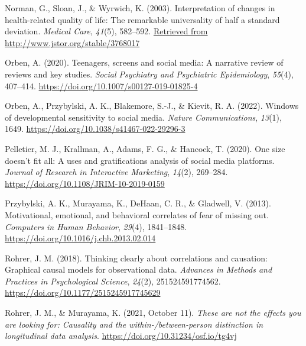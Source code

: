 \documentclass[
  man,mask,floatsintext]{apa7}
\newlength{\cslhangindent}
\newlength{\cslentryspacingunit} %
\newenvironment{CSLReferences}[2] %
 {%
  \setlength{\parindent}{0pt}
  \ifodd #1
  \let\oldpar\par
  \def\par{\hangindent=\cslhangindent\oldpar}
  \fi
  \setlength{\parskip}{#2\cslentryspacingunit}
 }%
 {}
\begin{document}
\begin{CSLReferences}{1}{0}
\leavevmode{}%
Norman, G., Sloan, J., \& Wyrwich, K. (2003). Interpretation of changes in health-related quality of life: {The} remarkable universality of half a standard deviation. \emph{Medical Care}, \emph{41}(5), 582--592. \href{Retrieved\%20from\%20http://www.jstor.org/stable/3768017}{Retrieved from http://www.jstor.org/stable/3768017}

\leavevmode{}%
Orben, A. (2020). Teenagers, screens and social media: A narrative review of reviews and key studies. \emph{Social Psychiatry and Psychiatric Epidemiology}, \emph{55}(4), 407--414. \url{https://doi.org/10.1007/s00127-019-01825-4}

\leavevmode{}%
Orben, A., Przybylski, A. K., Blakemore, S.-J., \& Kievit, R. A. (2022). Windows of developmental sensitivity to social media. \emph{Nature Communications}, \emph{13}(1), 1649. \url{https://doi.org/10.1038/s41467-022-29296-3}

\leavevmode{}%
Pelletier, M. J., Krallman, A., Adams, F. G., \& Hancock, T. (2020). One size doesn't fit all: A uses and gratifications analysis of social media platforms. \emph{Journal of Research in Interactive Marketing}, \emph{14}(2), 269--284. \url{https://doi.org/10.1108/JRIM-10-2019-0159}

\leavevmode{}%
Przybylski, A. K., Murayama, K., DeHaan, C. R., \& Gladwell, V. (2013). Motivational, emotional, and behavioral correlates of fear of missing out. \emph{Computers in Human Behavior}, \emph{29}(4), 1841--1848. \url{https://doi.org/10.1016/j.chb.2013.02.014}

\leavevmode{}%
Rohrer, J. M. (2018). Thinking clearly about correlations and causation: {Graphical} causal models for observational data. \emph{Advances in Methods and Practices in Psychological Science}, \emph{24}(2), 251524591774562. \url{https://doi.org/10.1177/2515245917745629}

\leavevmode{}%
Rohrer, J. M., \& Murayama, K. (2021, October 11). \emph{These are not the effects you are looking for: {Causality} and the within-/between-person distinction in longitudinal data analysis}. \url{https://doi.org/10.31234/osf.io/tg4vj}


\end{CSLReferences}
\end{document}
